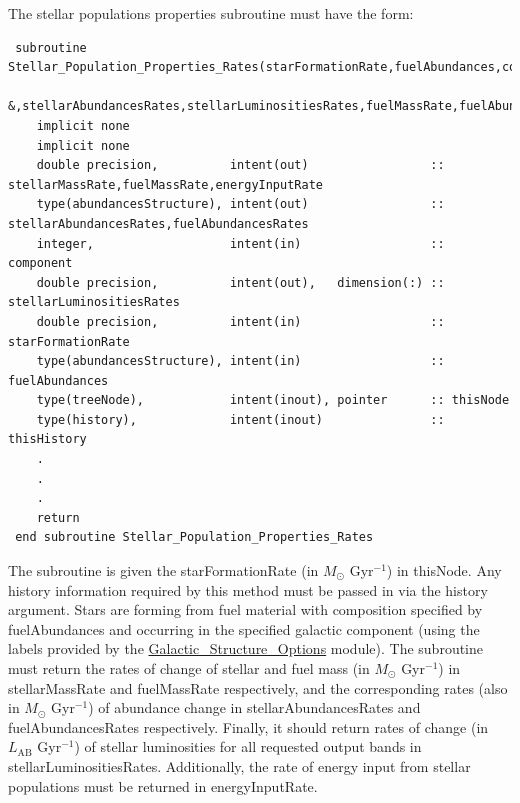 The stellar populations properties subroutine must have the form:
\begin{verbatim}
 subroutine Stellar_Population_Properties_Rates(starFormationRate,fuelAbundances,component,thisNode,thisHistory,stellarMassRate&
       &,stellarAbundancesRates,stellarLuminositiesRates,fuelMassRate,fuelAbundancesRates,energyInputRate)
    implicit none
    implicit none
    double precision,          intent(out)                 :: stellarMassRate,fuelMassRate,energyInputRate
    type(abundancesStructure), intent(out)                 :: stellarAbundancesRates,fuelAbundancesRates
    integer,                   intent(in)                  :: component
    double precision,          intent(out),   dimension(:) :: stellarLuminositiesRates
    double precision,          intent(in)                  :: starFormationRate
    type(abundancesStructure), intent(in)                  :: fuelAbundances
    type(treeNode),            intent(inout), pointer      :: thisNode
    type(history),             intent(inout)               :: thisHistory
    .
    .
    .
    return
 end subroutine Stellar_Population_Properties_Rates
\end{verbatim}
The subroutine is given the {\normalfont \ttfamily starFormationRate} (in $M_\odot$ Gyr$^{-1}$) in {\normalfont \ttfamily thisNode}. Any history information required by this method must be passed in via the {\normalfont \ttfamily history} argument. Stars are forming from fuel material with composition specified by {\normalfont \ttfamily fuelAbundances} and occurring in the specified galactic {\normalfont \ttfamily component} (using the labels provided by the \hyperlink{galactic_structure.options.F90:galactic_structure_options}{{\normalfont \ttfamily Galactic\_Structure\_Options}} module). The subroutine must return the rates of change of stellar and fuel mass (in $M_\odot$ Gyr$^{-1}$) in {\normalfont \ttfamily stellarMassRate} and {\normalfont \ttfamily fuelMassRate} respectively, and the corresponding rates (also in $M_\odot$ Gyr$^{-1}$) of abundance change in {\normalfont \ttfamily stellarAbundancesRates} and {\normalfont \ttfamily fuelAbundancesRates} respectively. Finally, it should return rates of change (in $L_\mathrm{AB}$ Gyr$^{-1}$) of stellar luminosities for all requested output bands in {\normalfont \ttfamily stellarLuminositiesRates}. Additionally, the rate of energy input from stellar 
populations must be returned in {\normalfont \ttfamily energyInputRate}.

